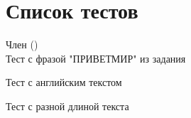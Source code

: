 \chapter{Список тестов }
\hypertarget{test}{}\label{test}

\begin{DoxyRefList}
\item[Член \doxylink{main_8cpp_ae66f6b31b5ad750f1fe042a706a4e3d4}{main} ()]\hfill \\
\label{test__test000001}%
%
Тест с фразой "{}ПРИВЕТМИР"{} из задания 



Тест с английским текстом 



Тест с разной длиной текста 
\end{DoxyRefList}
